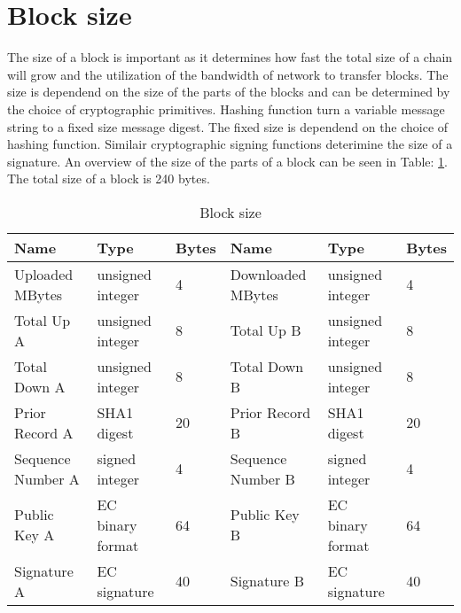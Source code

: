 \section{Block size}
The size of a block is important as it determines how fast the total size of a chain will grow
and the utilization of the bandwidth of network to transfer blocks.
The size is dependend on the size of the parts of the blocks
and can be determined by the choice of cryptographic primitives.
Hashing function turn a variable message string to a fixed size message digest\cite{VanderLubbe-crypto}.
The fixed size is dependend on the choice of hashing function.
Similair cryptographic signing functions deterimine the size of a signature.
An overview of the size of the parts of a block can be seen in Table: \ref{table:block_size}.
The total size of a block is 240 bytes.

\begin{table}[]
\begin{adjustwidth}{-.5in}{-.5in}
\begin{center}
\begin{tabular}{lll||lll}
Name              & Type             & Bytes                   & Name              & Type             & Bytes \\ \hline
Uploaded MBytes   & unsigned integer & 4                       & Downloaded MBytes & unsigned integer & 4     \\
Total Up A        & unsigned integer & 8                       & Total Up B        & unsigned integer & 8     \\
Total Down A      & unsigned integer & 8                       & Total Down B      & unsigned integer & 8     \\
Prior Record A    & SHA1 digest      & 20                      & Prior Record B    & SHA1 digest      & 20    \\
Sequence Number A & signed integer   & 4                       & Sequence Number B & signed integer   & 4     \\
Public Key A      & EC binary format & 64                      & Public Key B      & EC binary format & 64    \\
Signature A       & EC signature     & 40                      & Signature B       & EC signature     & 40
\end{tabular}
\caption{Block size}
\label{table:block_size}
\end{center}
\end{adjustwidth}
\end{table}

